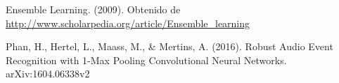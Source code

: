 \documentclass[spanish,11pt,letterpaper]{article}
\begin{document}
\begin{thebibliography}{9}
Ensemble Learning. (2009). Obtenido de
\url{http://www.scholarpedia.org/article/Ensemble_learning}

Phan, H., Hertel, L., Maass, M., \& Mertins, A. (2016).
Robust Audio Event Recognition with 1-Max Pooling Convolutional Neural Networks.
arXiv:1604.06338v2

\end{thebibliography}
\end{document}

